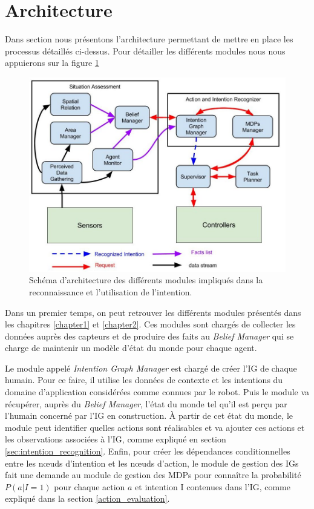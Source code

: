 \documentclass[a4paper,11pt,twoside]{StyleThese}
\begin{document}
\section{Architecture}

Dans section nous présentons l'architecture permettant de mettre en place les processus détaillés ci-dessus.
Pour détailler les différents modules nous nous appuierons sur la figure \ref{fig:intentionArch}

\begin{figure}[ht!]
  \centering
 \includegraphics[width=1.0\linewidth]{./intention/intentionArch.jpg} 
  \caption {Schéma d'architecture des différents modules impliqués dans la reconnaissance et l'utilisation de l'intention.}
  \label{fig:intentionArch}
\end{figure}

Dans un premier temps, on peut retrouver les différents modules présentés dans les chapitres \ref{chapter1} et \ref{chapter2}. Ces modules sont chargés de collecter les données auprès des capteurs et de produire des faits au \textit{Belief Manager} qui se charge de maintenir un modèle d'état du monde pour chaque agent.

Le module appelé \textit{Intention Graph Manager} est chargé de créer l'IG de chaque humain. Pour ce faire, il utilise les données de contexte et les intentions du domaine d'application considérées comme connues par le robot. Puis le module va récupérer, auprès du \textit{Belief Manager}, l'état du monde tel qu'il est perçu par l'humain concerné par l'IG en construction. À partir de cet état du monde, le module peut identifier quelles actions sont réalisables et va ajouter ces actions et les observations associées à l'IG, comme expliqué en section \ref{sec:intention_recognition}.
Enfin, pour créer les dépendances conditionnelles entre les nœuds d'intention et les nœuds d'action, le module de gestion des IGs fait une demande au module de gestion des MDPs pour connaître la probabilité \(P(a|I=1)\) pour chaque action $a$ et intention I contenues dans l'IG, comme expliqué dans la section \ref{action_evaluation}.
\end{document}
